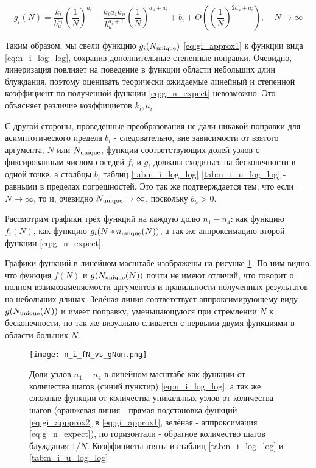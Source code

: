 \begin{large}
\begin{equation}
g_i(N) = \frac{k_i}{b_u^{a_i}} (\frac{1}{N})^{a_i} - \frac{k_i a_i k_u}{b_u^{a_i+1}} (\frac{1}{N})^{a_u+a_i} + b_i + O((\frac{1}{N})^{2 a_u +a_i}),\ \ \ \ \ N \to \infty
\end{equation}
\label{eq:g_n_expect}
\end{large}

Таким образом, мы свели функцию $g_i(N_{\textup{unique}})$ \eqref{eq:gi_approx1} к функции вида \eqref{eq:n_i_log_log}, сохранив дополнительные степенные поправки. 
Очевидно, линеризация повлияет на поведение в функции области небольших длин блуждания, поэтому оценивать теорически ожидаемые линейный и степенной коэффициент по полученной функции \eqref{eq:g_n_expect} невозможно.
Это объясняет различие коэффициетов $k_i, a_i$ 

С другой стороны, проведенные преобразования не дали никакой поправки для асимптотического предела $b_i$ - следовательно, вне зависимости от взятого аргумента, $N$ или $N_{\textup{unique}}$, функции соответствующих долей узлов с фиксированным числом соседей $f_i$ и $g_i$ должны сходиться на бесконечности в одной точке, а столбцы $b_i$ таблиц \ref{tab:n_i_log_log} \ref{tab:n_i_u_log_log} - равными в пределах погрешностей.
Это так же подтверждается тем, что если $N \to \infty$, то и, очевидно $N_{\textup{unique}} \to \infty$, поскольку $b_u > 0$.  

Рассмотрим графики трёх функций на каждую долю $n_1 - n_4$: как функцию $f_i(N)$, как функцию $g_i(N*n_{\textup{unique}}(N))$, а так же аппроксимацию второй функции \eqref{eq:g_n_expect}.

Графики функций в линейном масштабе изображены на рисунке \ref{fig:ni_fn_vs_gNun}. По ним видно, что функция $f(N)$ и $g(N_{\textup{unique}}(N))$ почти не имеют отличий, что говорит о полном взаимозаменяемости аргументов и правильности полученных результатов на небольших длинах. Зелёная линия соответствует аппроксимирующему виду $g(N_{\textup{unique}}(N))$ и имеет поправку, уменьшающуюся при стремлении $N$ к бесконечности, но так же визуально сливается с первыми двумя функциями в области больших $N$.

\begin{figure}
\centering
\texttt{[image: n\_i\_fN\_vs\_gNun.png]}
\label{fig:ni_fn_vs_gNun}
\caption{Доли узлов $n_1-n_4$ в линейном масштабе как функции от количества шагов (синий пунктир) \eqref{eq:n_i_log_log}, а так же сложные функции от количества уникальных узлов от количества шагов (оранжевая линия - прямая подстановка функций  \eqref{eq:gi_appprox2} в \eqref{eq:gi_approx1}, зелёная - аппроксимация \eqref{eq:g_n_expect}), по горизонтали - обратное количество шагов блуждания $1/N$. Коэффициеты взяты из таблиц \ref{tab:n_i_log_log} и \ref{tab:n_i_u_log_log}}
\end{figure}

